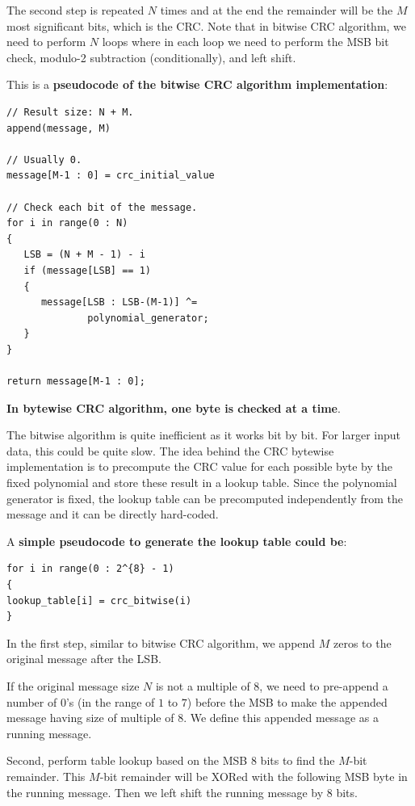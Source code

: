 \documentclass[fleqn]{IEEEtran}
\begin{document}
The second step is repeated $N$ times and at the end the remainder will be the 
$M$ most significant bits, which is the CRC. Note that in bitwise CRC
algorithm, we need to perform $N$ loops where in each loop 
we need to perform the MSB bit check, modulo-2 subtraction 
(conditionally), and left shift.

This is a \textbf{pseudocode of the bitwise CRC algorithm implementation}:
\begin{verbatim}
// Result size: N + M.
append(message, M)

// Usually 0.
message[M-1 : 0] = crc_initial_value

// Check each bit of the message.
for i in range(0 : N) 
{
   LSB = (N + M - 1) - i
   if (message[LSB] == 1)
   {
      message[LSB : LSB-(M-1)] ^=
              polynomial_generator;
   }
}

return message[M-1 : 0];
\end{verbatim}

\textbf{In bytewise CRC algorithm, one byte is checked at a time}. 

The bitwise algorithm is quite inefficient as it works bit by bit. 
For larger input data, this could be quite slow. The idea behind the CRC bytewise 
implementation is to precompute the CRC value for each possible byte by the 
fixed polynomial and store these result in a lookup table. Since the polynomial 
generator is fixed, 
the lookup table can be precomputed independently from the message and it
can be directly hard-coded. 

A \textbf{simple pseudocode to generate the lookup table could be}:
\begin{verbatim}
for i in range(0 : 2^{8} - 1)
{
lookup_table[i] = crc_bitwise(i)
}  
\end{verbatim}

In the first step, similar to bitwise CRC algorithm, we append $M$ zeros to 
the original message after the LSB. 

If the original message size $N$ is not a multiple of $8$, we need to pre-append 
a number of $0$’s (in the range of $1$ to $7$) before the MSB to make the 
appended message having size of multiple of $8$. We define this appended 
message as a running message. 

Second, perform table lookup based on the MSB $8$ bits to find the $M$-bit 
remainder. This $M$-bit remainder will be XORed with the following MSB 
byte in the running message. Then we left shift the running message by $8$ bits.
\end{document}
